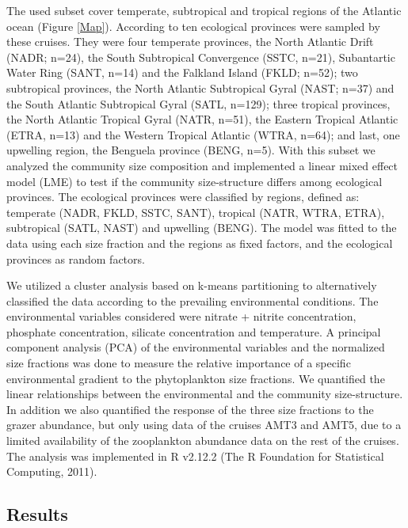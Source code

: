 The used subset cover temperate, subtropical and tropical regions of the Atlantic ocean (Figure \ref{Map}). According to \citet{Longhurst2006} ten ecological provinces were sampled by these cruises. They were four temperate provinces, the North Atlantic Drift (NADR; n=24), the South Subtropical Convergence (SSTC, n=21), Subantartic Water Ring (SANT, n=14) and the Falkland Island (FKLD; n=52); two subtropical provinces, the North Atlantic Subtropical Gyral (NAST; n=37) and the South Atlantic Subtropical Gyral (SATL, n=129); three tropical provinces, the North Atlantic Tropical Gyral (NATR, n=51), the Eastern Tropical Atlantic (ETRA, n=13) and the Western Tropical Atlantic (WTRA, n=64); and last, one upwelling region, the Benguela province (BENG, n=5). With this subset we analyzed the community size composition and implemented a linear mixed effect model (LME) to test if the community size-structure differs among ecological provinces. The ecological provinces were classified by regions, defined as: temperate (NADR, FKLD, SSTC, SANT), tropical (NATR, WTRA, ETRA), subtropical (SATL, NAST) and upwelling (BENG). The model was fitted to the data using each size fraction and the regions as fixed factors, and the ecological provinces as random factors.

We utilized a cluster analysis based on k-means partitioning to alternatively classified the data according to the prevailing environmental conditions. The environmental variables considered were nitrate + nitrite concentration, phosphate concentration, silicate concentration and temperature. A principal component analysis (PCA) of the environmental variables and the normalized size fractions was done to measure the relative importance of a specific environmental gradient to the phytoplankton size fractions. We quantified the linear relationships between the environmental and the community size-structure. In addition we also quantified the response of the three size fractions to the grazer abundance, but only using data of the cruises AMT3 and AMT5, due to a limited availability of the zooplankton abundance data on the rest of the cruises. The analysis was implemented in R v2.12.2 (The R Foundation for Statistical Computing, 2011).

\subsection{Results}

